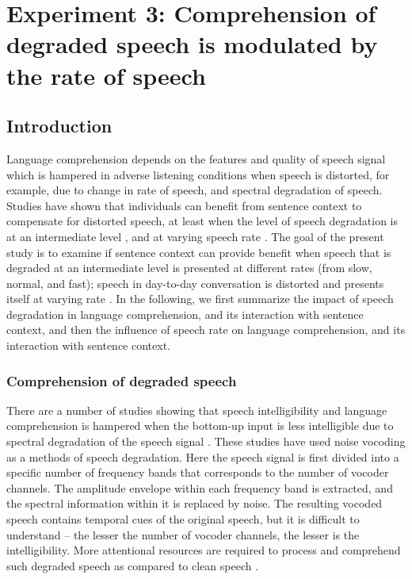 \documentclass[a4paper, nobind]{templates/ociamthesis}
\begin{document}
\hypertarget{experiment-3-comprehension-of-degraded-speech-is-modulated-by-the-rate-of-speech}{%
\chapter{Experiment 3: Comprehension of degraded speech is modulated by the rate of speech}\label{experiment-3-comprehension-of-degraded-speech-is-modulated-by-the-rate-of-speech}}

\minitoc

\hypertarget{introduction-1}{%
\section{Introduction}\label{introduction-1}}

Language comprehension depends on the features and quality of speech signal
which is hampered in adverse listening conditions when speech is distorted, for example, due to change in rate of speech, and spectral degradation of speech.
Studies have shown that individuals can benefit from sentence context to compensate for distorted speech, at least when the level of speech degradation is at an intermediate level \autocites[e.g.,][]{Bhandari2021,Obleser2010}, and at varying speech rate \autocites{Aydelott2004}[cf.][]{Goy2013}.
The goal of the present study is to examine if sentence context can provide benefit when speech that is degraded at an intermediate level is presented at different rates (from slow, normal, and fast); speech in day-to-day conversation is distorted and presents itself at varying rate \autocite[e.g.,][]{Krause2004}.
In the following, we first summarize the impact of speech degradation in language comprehension, and its interaction with sentence context, and then the influence of speech rate on language comprehension, and its interaction with sentence context.

\hypertarget{comprehension-of-degraded-speech-1}{%
\subsection{Comprehension of degraded speech}\label{comprehension-of-degraded-speech-1}}

There are a number of studies showing that speech intelligibility and language comprehension is hampered when the bottom-up input is less intelligible due to spectral degradation of the speech signal \autocite{Shannon1995,Davis2005}.
These studies have used noise vocoding as a methods of speech degradation. Here the speech signal is first divided into a specific number of frequency bands that corresponds to the number of vocoder channels.
The amplitude envelope within each frequency band is extracted, and the spectral information within it is replaced by noise.
The resulting vocoded speech contains temporal cues of the original speech, but it is difficult to understand -- the lesser the number of vocoder channels, the lesser is the intelligibility.
More attentional resources are required to process and comprehend such degraded speech as compared to clean speech \autocites[e.g.,][]{Eckert2016,Wild2012}.
\end{document}
